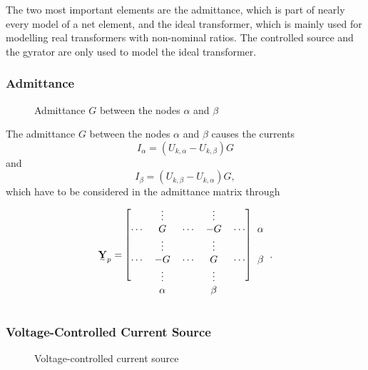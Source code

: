 The two most important elements are the admittance, which is part of nearly every model of a net element, and the ideal transformer, which is mainly used for modelling real transformers with non-nominal ratios. The controlled source and the gyrator are only used to model the ideal transformer.

\subsubsection{Admittance}

\begin{figure}
	\centering
	
	\caption{Admittance $G$ between the nodes $\alpha$ and $\beta$}
	\label{fig:admittance}
\end{figure}

The admittance $G$ between the nodes $\alpha$ and $\beta$  causes the currents
\begin{equation}
	I_\alpha = (U_{k,\alpha} - U_{k,\beta}) G
\end{equation}
and
\begin{equation}
	I_\beta = (U_{k,\beta} - U_{k,\alpha}) G,
\end{equation}
which have to be considered in the admittance matrix through
\begin{equation}
	\mat Y_p = 	
	\begin{blockarray}{cccccc}
		\begin{block}{[ccccc]c}
		 		& \vdots	&			& \vdots	&			& \\
		\cdots	& G			& \cdots	& -G		& \cdots	& \alpha \\
		 		& \vdots	&			& \vdots	&			& \\
		\cdots	& -G		& \cdots	& G			& \cdots	& \beta \\
		 		& \vdots	&			& \vdots	&			& \\
		\end{block}
				& \alpha	&			& \beta		&			& 
	\end{blockarray}.
\end{equation}

\subsubsection{Voltage-Controlled Current Source}

\begin{figure}
	\centering
	
	\caption{Voltage-controlled current source}
	\label{fig:voltage_controlled_current_source}
\end{figure}

